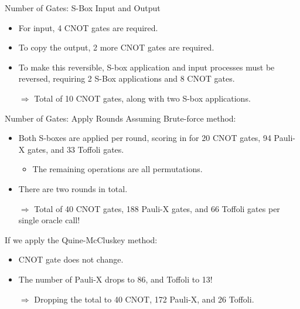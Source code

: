 \documentclass{beamer}
\begin{document}
	\begin{frame}{Number of Gates: S-Box Input and Output}
		\begin{itemize}
			\item For input, 4 CNOT gates are required.
			\item To copy the output, 2 more CNOT gates are required.
			\item To make this reversible, S-box application and input processes must be reversed, requiring 2 S-Box applications and 8 CNOT gates.
			\item[$\Rightarrow$] Total of 10 CNOT gates, along with two S-box applications.
		\end{itemize}
	\end{frame}
	
	\begin{frame}{Number of Gates: Apply Rounds}
		Assuming Brute-force method:
		\begin{itemize}
			\item Both S-boxes are applied per round, scoring in for 20 CNOT gates, 94 Pauli-X gates, and 33 Toffoli gates.
			\begin{itemize}
				\item The remaining operations are all permutations.
			\end{itemize}
			\item There are two rounds in total.
			\item[$\Rightarrow$] Total of 40 CNOT gates, 188 Pauli-X gates, and 66 Toffoli gates per single oracle call!
		\end{itemize}
		\smallskip
		If we apply the Quine-McCluskey method:
		\begin{itemize}
			\item CNOT gate does not change.
			\item The number of Pauli-X drops to 86, and Toffoli to 13!
			\item[$\Rightarrow$] Dropping the total to 40 CNOT, 172 Pauli-X, and 26 Toffoli.
		\end{itemize}
	\end{frame}
\end{document}
